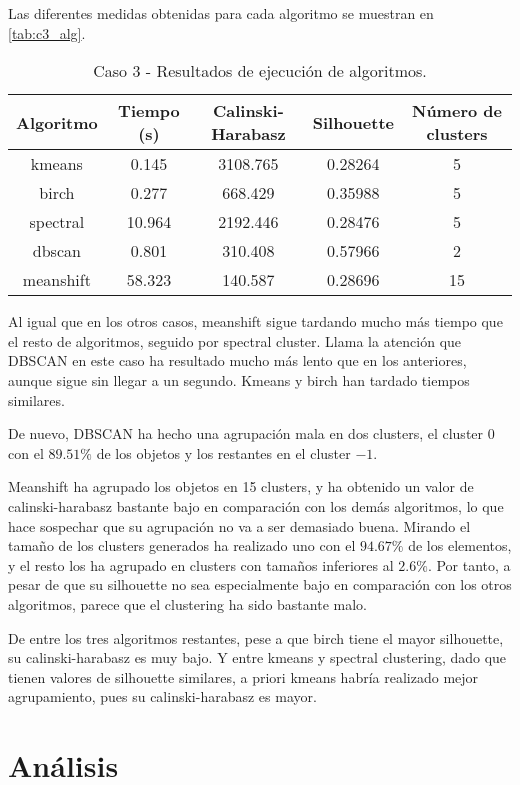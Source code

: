 Las diferentes medidas obtenidas para cada algoritmo se muestran en \eqref{tab:c3_alg}.

\begin{table}[H]
\centering
\caption{Caso 3 - Resultados de ejecución de algoritmos.}
\label{tab:c3_alg}
\begin{tabular}{ccccc}
\toprule
 Algoritmo & Tiempo (s) & Calinski-Harabasz & Silhouette & Número de clusters \\
\midrule
kmeans & 0.145 & 3108.765 & 0.28264 & 5 \\
birch & 0.277 & 668.429 & 0.35988 & 5 \\
spectral & 10.964 & 2192.446 & 0.28476 & 5 \\
dbscan & 0.801 & 310.408 & 0.57966 & 2 \\
meanshift & 58.323 & 140.587 & 0.28696 & 15 \\
\bottomrule
\end{tabular}
\end{table}

Al igual que en los otros casos, meanshift sigue tardando mucho más tiempo que el resto de algoritmos, seguido por spectral cluster. Llama la atención que DBSCAN en este caso ha resultado mucho más lento que en los anteriores, aunque sigue sin llegar a un segundo. Kmeans y birch han tardado tiempos similares.

De nuevo, DBSCAN ha hecho una agrupación mala en dos clusters, el cluster $0$ con el $89.51\%$ de los objetos y los restantes en el cluster $-1$.

Meanshift ha agrupado los objetos en 15 clusters, y ha obtenido un valor de calinski-harabasz bastante bajo en comparación con los demás algoritmos, lo que hace sospechar que su agrupación no va a ser demasiado buena. Mirando el tamaño de los clusters generados ha realizado uno con el $94.67\%$ de los elementos, y el resto los ha agrupado en clusters con tamaños inferiores al $2.6\%$. Por tanto, a pesar de que su silhouette no sea especialmente bajo en comparación con los otros algoritmos, parece que el clustering ha sido bastante malo.

De entre los tres algoritmos restantes, pese a que birch tiene el mayor silhouette, su calinski-harabasz es muy bajo. Y entre kmeans y spectral clustering, dado que tienen valores de silhouette similares, a priori kmeans habría realizado mejor agrupamiento, pues su calinski-harabasz es mayor.


\section{Análisis}


